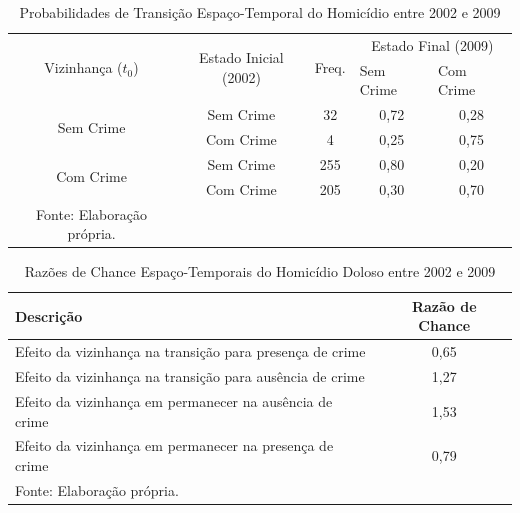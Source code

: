 \documentclass[12pt,openright,oneside,a4paper,english,french,spanish]{abntex2}
\numberwithin{table}{section} %
\numberwithin{figure}{section} %
\begin{document}
\begin{subappendices}
\begin{table}[H]
\centering
\caption{Probabilidades de Transição Espaço-Temporal do Homicídio entre 2002 e 2009}
        \begin{tabular}{ccccc}
            \hline
            \multirow{2}{*}{Vizinhança ($t_0$)} & \multirow{2}{*}{Estado Inicial (2002)} & \multirow{2}{*}{Freq.} & \multicolumn{2}{c}{Estado Final (2009)}  \\\cline{4-5} %
                                        & & & \multicolumn{1}{l}{Sem Crime} & \multicolumn{1}{l}{Com Crime} \\\hline
            \multirow{2}{*}{Sem Crime} & {Sem Crime} & 32 &  {0,72} & {0,28} \\
                                       & {Com Crime} & 4 &   {0,25} & {0,75} \\\hline
            \multirow{2}{*}{Com Crime} & {Sem Crime} & 255 & {0,80} & {0,20} \\
                                       & {Com Crime} & 205 & {0,30} & {0,70} \\\hline
            \tiny Fonte: Elaboração própria.
        \end{tabular}
    \label{tab:prob_espaco_tempo_hom_dol_2002_2009}
\end{table}


\begin{table}[H]
\centering
\caption{Razões de Chance Espaço-Temporais do Homicídio Doloso entre 2002 e 2009}
        \begin{tabular}{lc}
            \hline
            {\textbf{Descrição}} & {\textbf{Razão de Chance}} \\\hline
            {Efeito da vizinhança na transição para presença de crime} & {0,65} \\
            {Efeito da vizinhança na transição para ausência de crime} & {1,27} \\
            {Efeito da vizinhança em permanecer na ausência de crime} & {1,53} \\
            {Efeito da vizinhança em permanecer na presença de crime} & {0,79} \\\hline
            \tiny Fonte: Elaboração própria.
        \end{tabular}
    \label{tab:odds_espaco_tempo_hom_dol_2002_2009}
\end{table}
















\end{subappendices}
\end{document}
